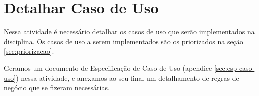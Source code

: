\section{Detalhar Caso de Uso}

Nessa atividade é necessário detalhar os casos de uso que serão implementados na disciplina. Os casos de uso a serem implementados são os priorizados na seção \ref{sec:priorizacao}.

Geramos um documento de Especificação de Caso de Uso (apendice \ref{sec:esp-caso-uso}) nessa atividade, e anexamos ao seu final um detalhamento de regras de negócio que se fizeram necessárias.
